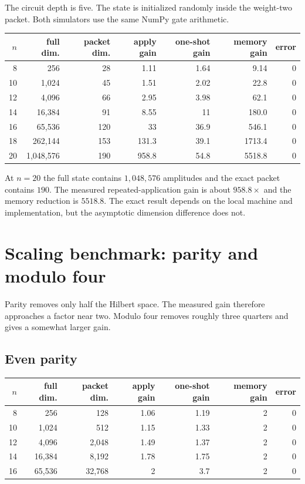 \documentclass[11pt]{article}
\begin{document}
The circuit depth is five.  The state is initialized randomly inside the weight-two packet.  Both simulators use the same NumPy gate arithmetic.

\begin{center}
\small
\begin{tabular}{rrrrrrr}
\toprule
$n$ & full dim. & packet dim. & apply gain & one-shot gain & memory gain & error\\
\midrule
8 & 256 & 28 & 1.11 & 1.64 & 9.14 & 0 \\
10 & 1,024 & 45 & 1.51 & 2.02 & 22.8 & 0 \\
12 & 4,096 & 66 & 2.95 & 3.98 & 62.1 & 0 \\
14 & 16,384 & 91 & 8.55 & 11 & 180.0 & 0 \\
16 & 65,536 & 120 & 33 & 36.9 & 546.1 & 0 \\
18 & 262,144 & 153 & 131.3 & 39.1 & 1713.4 & 0 \\
20 & 1,048,576 & 190 & 958.8 & 54.8 & 5518.8 & 0 \\
\bottomrule
\end{tabular}
\end{center}

At $n=20$ the full state contains $1{,}048{,}576$ amplitudes and the exact packet contains $190$.  The measured repeated-application gain is about $958.8\times$ and the memory reduction is $5518.8$.  The exact result depends on the local machine and implementation, but the asymptotic dimension difference does not.

\section{Scaling benchmark: parity and modulo four}

Parity removes only half the Hilbert space.  The measured gain therefore approaches a factor near two.  Modulo four removes roughly three quarters and gives a somewhat larger gain.

\subsection{Even parity}
\begin{center}
\small
\begin{tabular}{rrrrrrr}
\toprule
$n$ & full dim. & packet dim. & apply gain & one-shot gain & memory gain & error\\
\midrule
8 & 256 & 128 & 1.06 & 1.19 & 2 & 0 \\
10 & 1,024 & 512 & 1.15 & 1.33 & 2 & 0 \\
12 & 4,096 & 2,048 & 1.49 & 1.37 & 2 & 0 \\
14 & 16,384 & 8,192 & 1.78 & 1.75 & 2 & 0 \\
16 & 65,536 & 32,768 & 2 & 3.7 & 2 & 0 \\
\bottomrule
\end{tabular}
\end{center}
\end{document}
